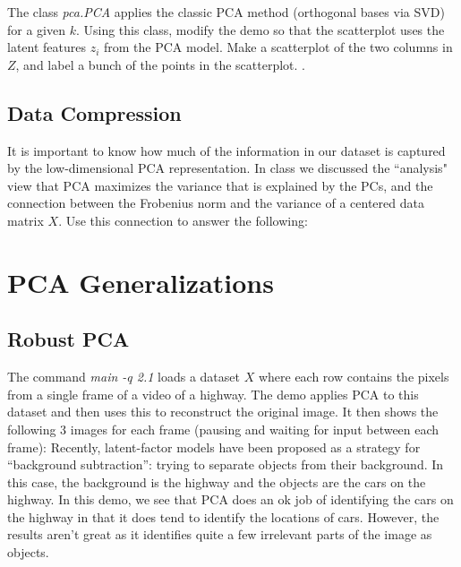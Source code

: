 \documentclass{article}
\begin{document}
The class \emph{pca.PCA} applies the classic PCA method (orthogonal bases via SVD) for a given $k$. 
Using this class, modify the demo so that the scatterplot uses the latent features $z_i$ from the PCA model. 
Make a scatterplot of the two columns in $Z$, and label a bunch of the points in the scatterplot. .

 

\subsection{Data Compression}

It is important to know how much of the information in our dataset is captured by the low-dimensional PCA representation.
In class we discussed the ``analysis" view that PCA maximizes the variance that is explained by the PCs, and the connection between the Frobenius norm and the variance of a centered data matrix $X$. Use this connection to answer the following:


\section{PCA Generalizations}


\subsection{Robust PCA}

The command \emph{main -q 2.1} loads a dataset $X$ where each row contains the pixels from a single frame of a video of a highway. The demo applies PCA to this dataset and then uses this to reconstruct the original image. 
It then shows the following 3 images for each frame (pausing and waiting for input between each frame):
Recently, latent-factor models have been proposed as a strategy for ``background subtraction'': trying to separate objects from their background. In this case, the background is the highway and the objects are the cars on the highway. In this demo, we see that PCA does an ok job of identifying the cars on the highway in that it does tend to identify the locations of cars. However, the results aren't great as it identifies quite a few irrelevant parts of the image as objects.
\end{document}
